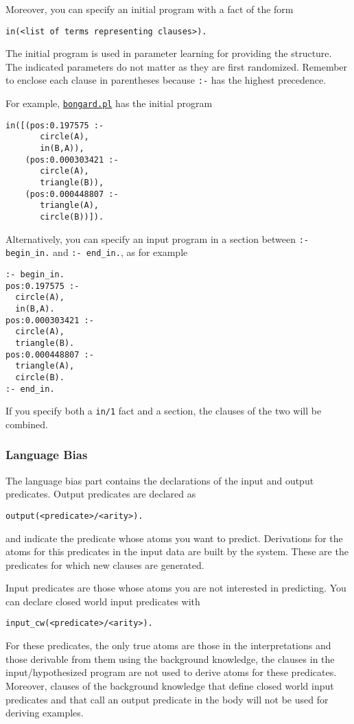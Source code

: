 Moreover, you can specify an initial program with a fact of the form 
\begin{verbatim}
in(<list of terms representing clauses>).
\end{verbatim}
The initial program is used in parameter learning for providing 
the structure. The indicated parameters do not matter as they are first randomized.
Remember to enclose each clause in parentheses because \verb|:-| has the highest precedence.

For example, \href{http://cplint.lamping.unife.it/example/learning/bongard.pl}{\texttt{bongard.pl}} has the initial program 
\begin{verbatim}
in([(pos:0.197575 :-
       circle(A),
       in(B,A)),
    (pos:0.000303421 :-
       circle(A),
       triangle(B)), 
    (pos:0.000448807 :-
       triangle(A),
       circle(B))]).
\end{verbatim}
Alternatively, you can specify an input program in a section between \verb|:- begin_in.| and \verb|:- end_in.|, as for example
\begin{verbatim}
:- begin_in.
pos:0.197575 :-
  circle(A),
  in(B,A).
pos:0.000303421 :-
  circle(A),
  triangle(B).
pos:0.000448807 :-
  triangle(A),
  circle(B).
:- end_in.
\end{verbatim}
If you specify both a \verb|in/1| fact and a section, the clauses of the two will be combined.



\subsubsection{Language Bias}
%
The language bias part contains the declarations of the input and output predicates.
Output predicates are declared as
\begin{verbatim}
output(<predicate>/<arity>).
\end{verbatim}
and indicate the predicate whose atoms you want to predict. Derivations for the atoms for this predicates in the input data
are built by the system. These are the predicates for which new clauses are generated.

Input predicates are those whose atoms you are not interested in predicting. You can declare closed world input predicates with
\begin{verbatim}
input_cw(<predicate>/<arity>).
\end{verbatim}
For these predicates, the only true atoms are those in the interpretations and those derivable from them using the background knowledge, the clauses in the input/hypothesized program are not used to derive atoms for these predicates. Moreover,   clauses of the background knowledge that define closed world input predicates and that call an output predicate in the body will not be used for deriving examples.

